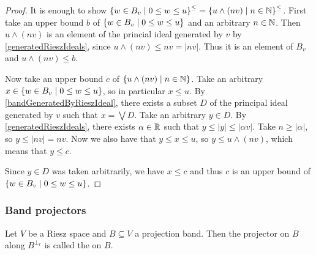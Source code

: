 \begin{proof}
It is enough to show $\setbuilder{w\in B_v}{0\leq w\leq u}^\leq = \setbuilder{u\wedge (nv)}{n\in \N}^\leq$. First take an upper bound $b$ of $\setbuilder{w\in B_v}{0\leq w\leq u}$ and an arbitrary $n\in \mathbb{N}$. Then $u\wedge (nv)$ is an element of the princial ideal generated by $v$ by \ref{generatedRieszIdeals}, since $u\wedge (nv) \leq nv = |nv|$. Thus it is an element of $B_v$ and $u\wedge (nv)\leq b$.

Now take an upper bound $c$ of $\setbuilder{u\wedge (nv)}{n\in \N}$. Take an arbitrary $x\in \setbuilder{w\in B_v}{0\leq w\leq u}$, so in particular $x\leq u$. By \ref{bandGeneratedByRieszIdeal}, there exists a subset $D$ of the principal ideal generated by $v$ such that $x = \bigvee D$. Take an arbitrary $y\in D$. By \ref{generatedRieszIdeals}, there exists $\alpha \in \mathbb{R}$ such that $y\leq |y|\leq |\alpha v|$. Take $n\geq |\alpha|$, so $y \leq |nv| = nv$. Now we also have that $y\leq x \leq u$, so $y \leq u\wedge (nv)$, which means that $y \leq c$.

Since $y\in D$ was taken arbitrarily, we have $x\leq c$ and thus $c$ is an upper bound of $\setbuilder{w\in B_v}{0\leq w\leq u}$.
\end{proof}

\subsubsection{Band projectors}
\begin{definition}
Let $V$ be a Riesz space and $B \subseteq V$ a projection band. Then the projector on $B$ along $B^{\perp_r}$ is called the  on $B$.
\end{definition}

